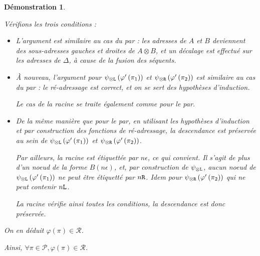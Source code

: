 \documentclass[11pt,a4paper]{article}
\newtheorem{demonstration}{Démonstration}
\newcommand*{\tensor}{\otimes}
\newcommand*{\someproof}{\pi}
\newcommand*{\Left}{\textnormal{\texttt{L}}}
\newcommand*{\Right}{\textnormal{\texttt{R}}}
\newcommand*{\proofs}{\ensuremath{\mathcal{P}}}
\newcommand*{\representations}{\ensuremath{\mathcal{R}}}
\newcommand*{\encode}{\ensuremath{\varphi}}
\begin{document}
\begin{demonstration}
\begin{itemize}
    Vérifions les trois conditions :
    \begin{itemize}
        \item[(i) :] L'argument est similaire au cas du par : les adresses de $A$ et $B$ deviennent des sous-adresses gauches et droites de $A \tensor B$, et un décalage est effectué sur les adresses de $\Delta$, à cause de la fusion des séquents.

        \item[(ii) :] À nouveau, l'argument pour $\psi_{\tensor\Left} \left( \encode' \left( \pi_1 \right) \right)$ et $\psi_{\tensor\Right} \left( \encode' \left( \pi_2 \right) \right)$ est similaire au cas du par : le ré-adressage est correct, et on se sert des hypothèses d'induction. 
        
        Le cas de la racine se traite également comme pour le par.

        \item[(iii) :] De la même manière que pour le par, en utilisant les hypothèses d'induction et par construction des fonctions de ré-adressage, la descendance est préservée au sein de $\psi_{\tensor\Left} \left( \encode' \left( \pi_1 \right) \right)$ et $\psi_{\tensor\Right} \left( \encode' \left( \pi_2 \right) \right)$.

        Par ailleurs, la racine est étiquettée par $n \epsilon$, ce qui convient. Il s'agit de plus d'un noeud de la forme $B(n \epsilon)$, et, par construction de $\psi_{\tensor\Left}$, aucun noeud de $\psi_{\tensor\Left} \left( \encode' \left( \pi_1 \right) \right)$ ne peut être étiquetté par $n \Right$. Idem pour $\psi_{\tensor\Right} \left( \encode' \left( \pi_2 \right) \right)$ qui ne peut contenir $n \Left$.

        La racine vérifie ainsi toutes les conditions, la descendance est donc préservée.
    \end{itemize}

    On en déduit $\encode \left( \someproof \right) \in \representations$.

    \end{itemize}

    Ainsi, $\forall \someproof \in \proofs, \encode \left( \someproof \right) \in \representations$.
    
\end{demonstration}
\end{document}
